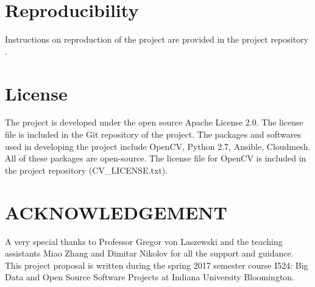 \documentclass[9pt,twocolumn,twoside]{../../styles/osajnl}
\begin{document}
\section{Reproducibility}
Instructions on reproduction of the project are provided in the project 
repository \cite{git-self-code}.

\section{License}
The project is developed under the open source Apache License 2.0. The license
file is included in the Git repository of the project.
The packages and softwares used in developing the project include OpenCV,
Python 2.7, Ansible, Cloudmesh. All of these packages are open-source. 
The license file for OpenCV is included in the project repository
(CV\_LICENSE.txt).

\section{ACKNOWLEDGEMENT}
A very special thanks to Professor Gregor von Laszewski and the
teaching assistants Miao Zhang and Dimitar Nikolov for all the support
and guidance. This project proposal is written during the spring 2017
semester course {I524: Big Data and Open Source Software Projects} at
Indiana University Bloomington.
\end{document}
